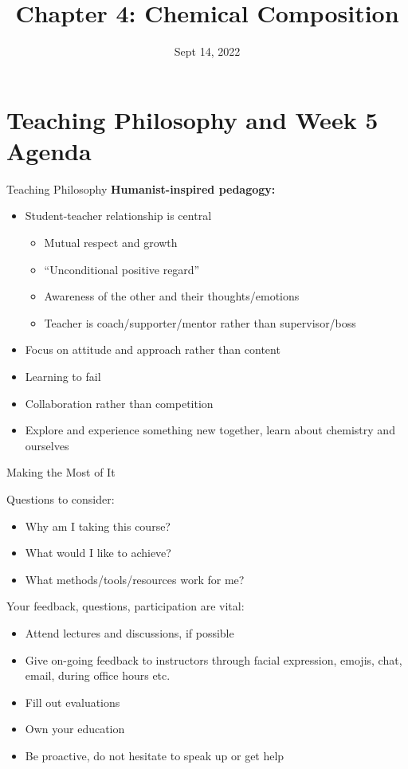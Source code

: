 \documentclass[11pt]{beamer}
\title{Chapter 4: Chemical Composition}
\institute{Chemistry Department, Cypress College}
\date{Sept 14, 2022}
\begin{document}
\begin{frame}
  \titlepage
\end{frame}

\section{Teaching Philosophy and Week 5 Agenda}

\begin{frame}{Teaching Philosophy}
  \textbf{Humanist-inspired pedagogy:}
  \begin{itemize}
  \item Student-teacher relationship is central
    \begin{itemize}
    \item Mutual respect and growth
    \item ``Unconditional positive regard''
    \item Awareness of the other and their thoughts/emotions
    \item Teacher is coach/supporter/mentor rather than supervisor/boss
    \end{itemize}
  \item Focus on attitude and approach rather than content
  \item Learning to fail
  \item Collaboration rather than competition
  \item Explore and experience something new together, learn about
    chemistry and ourselves
  \end{itemize}
\end{frame}

\begin{frame}{Making the Most of It}

  Questions to consider:
  \begin{itemize}
  \item Why am I taking this course?
  \item What would I like to achieve?
  \item What methods/tools/resources work for me?
  \end{itemize}

  Your feedback, questions, participation are vital:
  \begin{itemize}
  \item Attend lectures and discussions, if possible
  \item Give on-going feedback to instructors through facial expression,
    emojis, chat, email, during office hours etc.
  \item Fill out evaluations
  \item Own your education
  \item Be proactive, do not hesitate to speak up or get help
  \end{itemize}

\end{frame}
\end{document}
